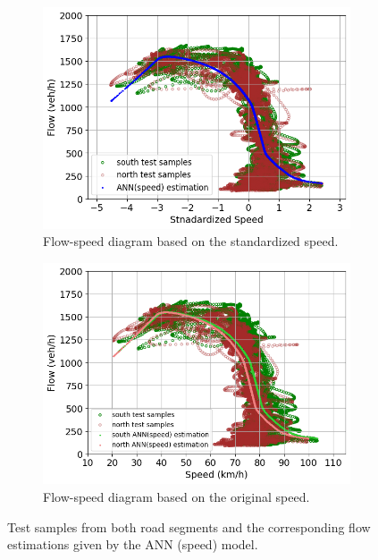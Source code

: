 \documentclass[english]{kththesis}
\begin{document}
\begin{figure}[!ht]
    \centering
    \begin{subfigure}{0.7\textwidth}
        \centering
        \includegraphics[width=\textwidth]{relation_shift_ann_a.png}
        \caption{Flow-speed diagram based on the standardized speed.}
        \label{subfig:relation_shift_ann_standardized}
    \end{subfigure}
    \hfill
    \begin{subfigure}{0.7\textwidth}
        \centering
        \includegraphics[width=\textwidth]{relation_shift_ann_b.png}
        \caption{Flow-speed diagram based on the original speed.}
        \label{subfig:relation_shift_ann_raw}
    \end{subfigure}
    \caption{Test samples from both road segments and the corresponding flow estimations given by the ANN (speed) model.}
    \label{fig:relation_shift_ann}
\end{figure}
\end{document}
